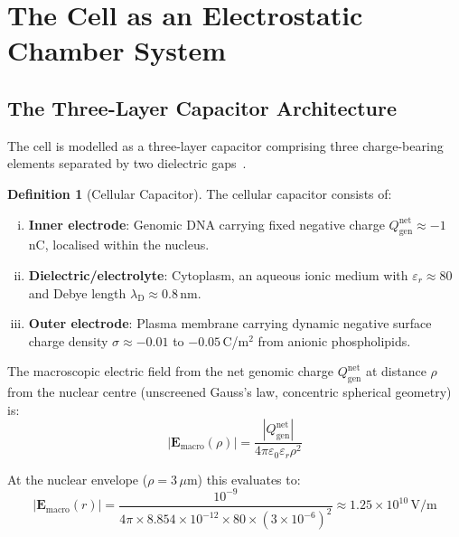 \documentclass[11pt,twocolumn,a4paper]{article}
\theoremstyle{definition}
\newtheorem{definition}[theorem]{Definition}
\theoremstyle{remark}
\newcommand{\lD}{\lambda_{\mathrm{D}}}
\newcommand{\Qgen}{Q_{\mathrm{gen}}}
\newcommand{\eps}{\varepsilon}
\newcommand{\epsz}{\varepsilon_{0}}
\newcommand{\vv}[1]{\boldsymbol{#1}}
\newcommand{\abs}[1]{\left|#1\right|}
\begin{document}
\section{The Cell as an Electrostatic Chamber System}
\label{sec:chambers}

\subsection{The Three-Layer Capacitor Architecture}

The cell is modelled as a three-layer capacitor comprising three charge-bearing elements separated by two dielectric gaps~\cite{McLaughlin1989,Bhaskara2010}.

\begin{definition}[Cellular Capacitor]
The cellular capacitor consists of:
\begin{enumerate}[(i)]
  \item \textbf{Inner electrode}: Genomic DNA carrying fixed negative charge $\Qgen^{\mathrm{net}} \approx -1$\,nC, localised within the nucleus.
  \item \textbf{Dielectric/electrolyte}: Cytoplasm, an aqueous ionic medium with $\eps_r \approx 80$ and Debye length $\lD \approx 0.8$\,nm.
  \item \textbf{Outer electrode}: Plasma membrane carrying dynamic negative surface charge density $\sigma \approx -0.01$ to $-0.05$\,C/m$^2$ from anionic phospholipids.
\end{enumerate}
\end{definition}

The macroscopic electric field from the net genomic charge $\Qgen^{\mathrm{net}}$ at distance $\rho$ from the nuclear centre (unscreened Gauss's law, concentric spherical geometry) is:
\begin{equation}
  \abs{\vv{E}_{\mathrm{macro}}(\rho)} = \frac{\abs{\Qgen^{\mathrm{net}}}}{4\pi \epsz \eps_r \rho^2}
  \label{eq:cytoplasmic_field}
\end{equation}

At the nuclear envelope ($\rho = 3\,\mu$m) this evaluates to:
\begin{equation}
  \abs{\vv{E}_{\mathrm{macro}}(r)} = \frac{10^{-9}}{4\pi \times 8.854 \times 10^{-12} \times 80 \times (3 \times 10^{-6})^2} \approx 1.25 \times 10^{10}\,\mathrm{V/m}
\end{equation}
\end{document}
